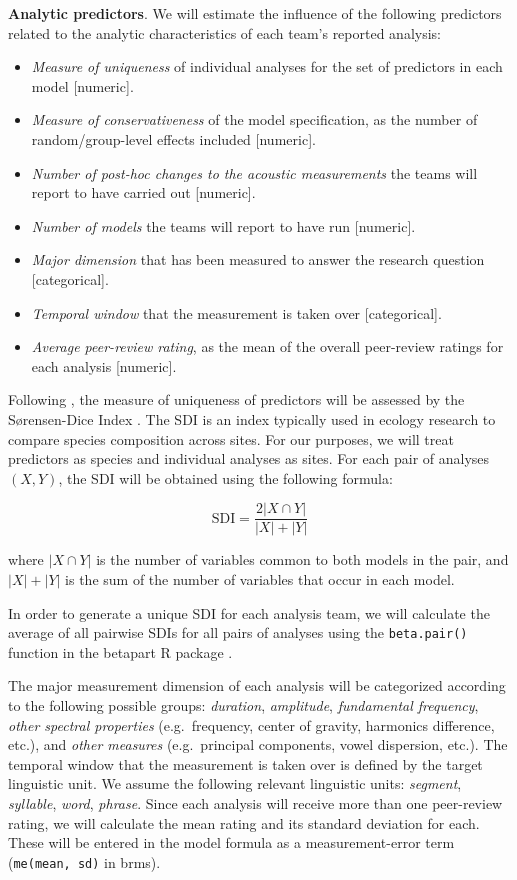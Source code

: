 \documentclass[Review,times,sageh]{sagej}
\providecommand{\tightlist}{\setlength{\itemsep}{0pt}\setlength{\parskip}{0pt}}
\begin{document}
\textbf{Analytic predictors}. We will estimate the influence of the
following predictors related to the analytic characteristics of each
team's reported analysis:

\begin{itemize}
\tightlist
\item
  \emph{Measure of uniqueness} of individual analyses for the set of
  predictors in each model {[}numeric{]}.
\item
  \emph{Measure of conservativeness} of the model specification, as the
  number of random/group-level effects included {[}numeric{]}.
\item
  \emph{Number of post-hoc changes to the acoustic measurements} the
  teams will report to have carried out {[}numeric{]}.
\item
  \emph{Number of models} the teams will report to have run
  {[}numeric{]}.
\item
  \emph{Major dimension} that has been measured to answer the research
  question {[}categorical{]}.
\item
  \emph{Temporal window} that the measurement is taken over
  {[}categorical{]}.
\item
  \emph{Average peer-review rating}, as the mean of the overall
  peer-review ratings for each analysis {[}numeric{]}.
\end{itemize}

Following \citet{Parker2020}, the measure of uniqueness of predictors
will be assessed by the Sørensen-Dice Index
\citep[SDI,][]{dice1945, sorensen1948}. The SDI is an index typically
used in ecology research to compare species composition across sites.
For our purposes, we will treat predictors as species and individual
analyses as sites. For each pair of analyses \((X, Y)\), the SDI will be
obtained using the following formula:

\[\text{SDI} = \frac{2|X \cap Y|}{|X|+|Y|}\]

where \(|X \cap Y|\) is the number of variables common to both models in
the pair, and \(|X|+|Y|\) is the sum of the number of variables that
occur in each model.

In order to generate a unique SDI for each analysis team, we will
calculate the average of all pairwise SDIs for all pairs of analyses
using the \texttt{beta.pair()} function in the betapart R package
\citep{baselga2020}.

The major measurement dimension of each analysis will be categorized
according to the following possible groups: \emph{duration},
\emph{amplitude}, \emph{fundamental frequency}, \emph{other spectral
properties} (e.g.~frequency, center of gravity, harmonics difference,
etc.), and \emph{other measures} (e.g.~principal components, vowel
dispersion, etc.). The temporal window that the measurement is taken
over is defined by the target linguistic unit. We assume the following
relevant linguistic units: \emph{segment}, \emph{syllable}, \emph{word},
\emph{phrase}. Since each analysis will receive more than one
peer-review rating, we will calculate the mean rating and its standard
deviation for each. These will be entered in the model formula as a
measurement-error term (\texttt{me(mean,\ sd)} in brms).
\end{document}
